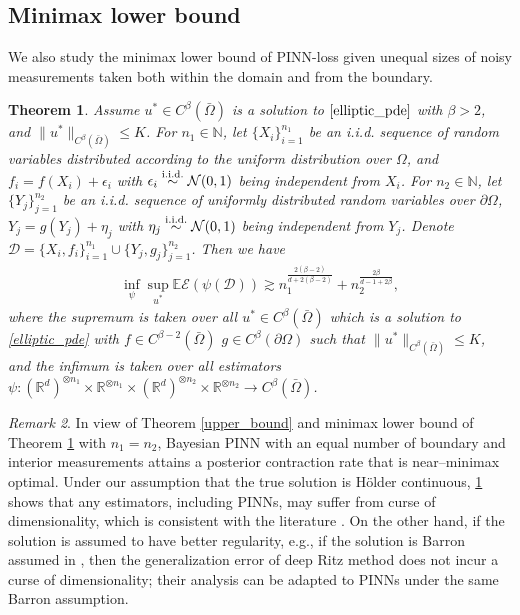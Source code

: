 \documentclass{article}
\newcommand{\R}{\mathbb{R}}
\newcommand{\E}{\mathbb{E}}
\newcommand{\N}{\mathcal{N}}
\newcommand{\D}{\mathcal{D}}
\theoremstyle{plain}
\newtheorem{theorem}{Theorem}[section]
\theoremstyle{definition}
\theoremstyle{remark}
\newtheorem{remark}[theorem]{Remark}
\begin{document}
\subsection{Minimax lower bound}
We also study the minimax lower bound of PINN-loss given unequal sizes of noisy measurements taken both within the domain and from the boundary. 
\begin{theorem} \label{lower_bound}
    Assume $u^* \in C^{\beta}(\bar{\Omega})$ is a solution to $\eqref{elliptic_pde}$ with  $\beta > 2$, and $\|u^*\|_{C^{\beta}(\bar{\Omega})} \leq K$. For $n_1 \in \mathbb{N}$, let $\{X_i\}_{i=1}^{n_1}$ be an i.i.d. sequence of random variables distributed according to the uniform distribution over $\Omega$, and $f_i = f(X_i) + \epsilon_i$ with $\epsilon_i \overset{\textnormal{i.i.d.}}{\sim} \N(0, 1)$ being independent from $X_i$. For $n_2 \in \mathbb{N}$, let $\{Y_j\}_{j=1}^{n_2}$ be an i.i.d. sequence of uniformly distributed random variables over $\partial \Omega$, $Y_j = g(Y_j) + \eta_j$ with $\eta_j \overset{\textnormal{i.i.d.}}{\sim} \N(0, 1)$ being independent from $Y_j$. Denote $\D = \{X_i, f_i\}_{i=1}^{n_1} \cup \{Y_j, g_j\}_{j=1}^{n_2}$. Then we have
    \begin{align*}
        \inf_\psi \sup_{u^*} \E \mathcal{E}(\psi(\D)) \gtrsim n_1^{\frac{2(\beta-2)}{d + 2(\beta-2)}} + n_2^{\frac{2\beta}{d-1 + 2\beta}},
    \end{align*}
    where the supremum is taken over all $u^* \in C^\beta(\bar{\Omega})$ which is a solution to \eqref{elliptic_pde} with $f \in C^{\beta-2}(\bar{\Omega})$ $g \in C^\beta(\partial{\Omega})$ such that $\|u^*\|_{C^\beta(\bar{\Omega})} \leq K$, and the infimum is taken over all estimators $\psi: (\R^{d})^{\otimes n_1} \times \R^{\otimes n_1} \times (\R^d)^{\otimes n_2} \times \R^{\otimes n_2}\to C^\beta(\bar{\Omega})$.
\end{theorem}

\begin{remark}
    In view of Theorem \ref{upper_bound} and  minimax lower bound of Theorem \ref{lower_bound} with $n_1=n_2$, Bayesian PINN with an equal number of boundary and interior measurements attains a posterior contraction rate that is near–minimax optimal. Under our assumption that the true solution is Hölder continuous, \ref{lower_bound} shows that any estimators, including PINNs, may suffer from curse of dimensionality, which is consistent with the literature \cite{lu2021machine, jiao2021rate}. On the other hand, if the solution is assumed to have better regularity, e.g., if the solution is Barron assumed in \cite{lu2021priori}, then the generalization error of deep Ritz method does not incur a curse of dimensionality; their analysis can be adapted to PINNs under the same Barron assumption. 
\end{remark}
\end{document}
